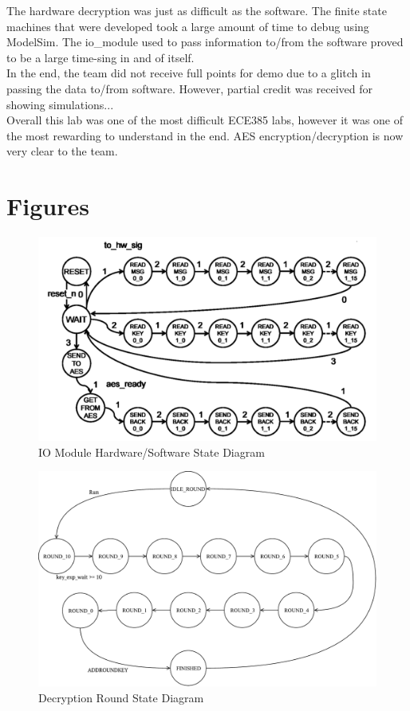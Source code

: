 \documentclass[journal, twocolumn, final,11pt,letterpaper]{IEEEtran}
\begin{document}
The hardware decryption was just as difficult as the software. The finite state machines that were developed took a large amount of time to debug using ModelSim. The io\_module used to pass information to/from the software proved to be a large time-sing in and of itself. \\

In the end, the team did not receive full points for demo due to a glitch in passing the data to/from software. However, partial credit was received for showing simulations...\\

Overall this lab was one of the most difficult ECE385 labs, however it was one of the most rewarding to understand in the end. AES encryption/decryption is now very clear to the team.

\clearpage
\onecolumn
\section{Figures}


\begin{figure} [H]
	\centering
	\includegraphics[scale=.6]{IO_Module_State_Diagram.png}
	\caption{IO Module Hardware/Software State Diagram\label{fig:io-module}}
\end{figure}  


\begin{figure} [H]
	\centering
	\includegraphics[scale=.6]{Decryption_Round_State_Diagram.pdf}
	\caption{Decryption Round State Diagram\label{fig:round-state}}
\end{figure}          
\end{document}
